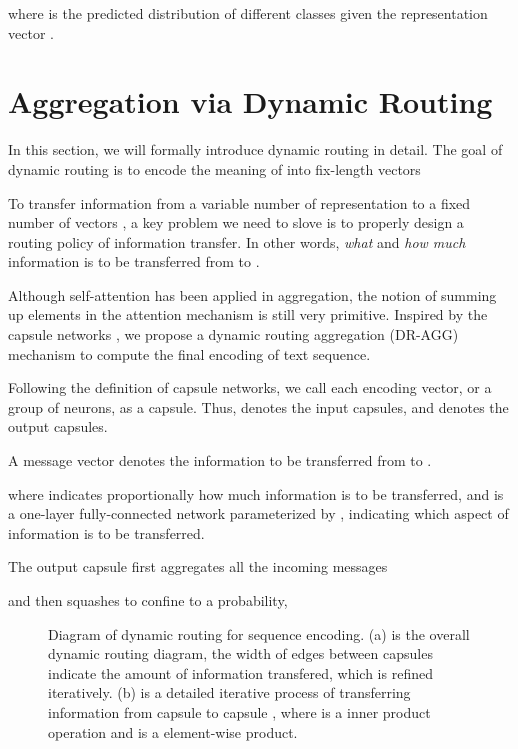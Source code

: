 \documentclass[11pt]{article}
\begin{document}
 where  is the predicted distribution of different classes given the representation vector .

\section{Aggregation via Dynamic Routing}
\label{sec:dyrout}
In this section, we will formally introduce dynamic routing in detail.
The goal of dynamic routing is to encode the meaning of  into  fix-length vectors


To transfer information from a variable number of representation  to a fixed number of vectors ,
a key problem we need to slove is to properly design a routing policy of information transfer. In other words, \textit{what} and \textit{how much} information is to be transferred from  to .

Although self-attention has been applied in aggregation, the notion of summing up elements in the attention mechanism is still very primitive.
Inspired by the capsule networks \cite{DBLP:conf/nips/SabourFH17}, we propose a dynamic routing aggregation (DR-AGG) mechanism to compute the final encoding of text sequence.

Following the definition of capsule networks, we call each encoding vector, or a group of neurons, as a capsule. Thus,  denotes the input capsules, and  denotes the output capsules.

A message vector  denotes the information to be transferred from  to .

where  indicates proportionally how much information is to be transferred, and  is a one-layer fully-connected network parameterized by , indicating which aspect of information is to be transferred.

The output capsule  first aggregates all the incoming messages

and then squashes  to confine  to a probability,








\begin{figure}[t]
 \centering
 \hspace{2em}
  \caption{Diagram of dynamic routing for sequence encoding. (a) is the overall dynamic routing diagram, the width of edges between capsules  indicate the amount of information transfered, which is refined iteratively. (b) is a detailed iterative process of transferring information from capsule  to capsule , where  is a inner product operation and  is a element-wise product.}\label{fig:dyroute}
\end{figure}
\end{document}
